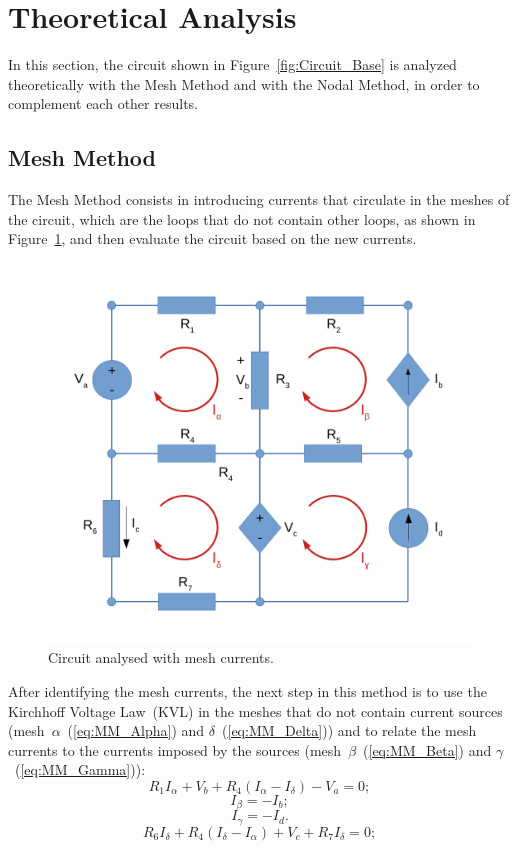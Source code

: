 \section{Theoretical Analysis}
\label{sec:analysis}

In this section, the circuit shown in Figure~\ref{fig:Circuit_Base} is analyzed theoretically with the Mesh Method and with the Nodal Method, in order to complement each other results.

\subsection{Mesh Method}

The Mesh Method consists in introducing currents that circulate in the meshes of the circuit, which are the loops that do not contain other loops, as shown in Figure~\ref{fig:Circuit_Mesh}, and then evaluate the circuit based on the new currents.
\begin{figure}[h] \centering
\includegraphics[width=0.45\linewidth]{CircuitMesh.pdf}
\caption{Circuit analysed with mesh currents.}
\label{fig:Circuit_Mesh}
\end{figure}

After identifying the mesh currents, the next step in this method is to use the Kirchhoff Voltage Law~(KVL) in the meshes that do not contain current sources (mesh~$\alpha$~(\ref{eq:MM_Alpha}) and $\delta$~(\ref{eq:MM_Delta})) and to relate the mesh currents to the currents imposed by the sources (mesh~$\beta$~(\ref{eq:MM_Beta}) and $\gamma$~(\ref{eq:MM_Gamma})):
\begin{equation}
  R_1I_{\alpha} + V_b + R_4(I_{\alpha}-I_{\delta}) - V_a = 0;
  \label{eq:MM_Alpha}
\end{equation}
\begin{equation}
  I_{\beta} = - I_b;
  \label{eq:MM_Beta}
\end{equation}
\begin{equation}
  I_{\gamma} = - I_d.
  \label{eq:MM_Gamma}
\end{equation}
\begin{equation}
  R_6I_{\delta} + R_4(I_{\delta}-I_{\alpha}) + V_c + R_7I_{\delta} = 0;
  \label{eq:MM_Delta}
\end{equation}

